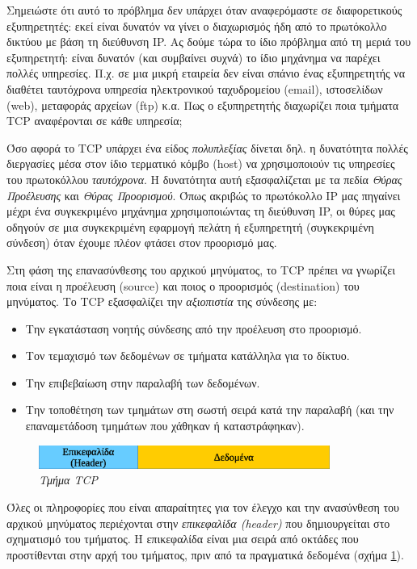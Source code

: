 Σημειώστε ότι αυτό το πρόβλημα δεν υπάρχει όταν αναφερόμαστε σε διαφορετικούς εξυπηρετητές: εκεί είναι δυνατόν να γίνει ο διαχωρισμός ήδη από το πρωτόκολλο δικτύου με βάση τη διεύθυνση IP. Ας δούμε τώρα το ίδιο πρόβλημα από τη μεριά του εξυπηρετητή: είναι δυνατόν (και συμβαίνει συχνά) το ίδιο μηχάνημα να παρέχει πολλές υπηρεσίες. Π.χ. σε μια μικρή εταιρεία δεν είναι σπάνιο ένας εξυπηρετητής να διαθέτει ταυτόχρονα υπηρεσία ηλεκτρονικού ταχυδρομείου (email), ιστοσελίδων (web), μεταφοράς αρχείων (ftp) κ.α. Πως ο εξυπηρετητής διαχωρίζει ποια τμήματα TCP αναφέρονται σε κάθε υπηρεσία;

Όσο αφορά το TCP υπάρχει ένα είδος \emph{πολυπλεξίας} δίνεται δηλ. η δυνατότητα πολλές διεργασίες μέσα στον ίδιο τερματικό κόμβο (host) να χρησιμοποιούν τις υπηρεσίες του πρωτοκόλλου \emph{ταυτόχρονα}. Η δυνατότητα αυτή εξασφαλίζεται με τα πεδία \emph{Θύρας Προέλευσης} και \emph{Θύρας Προορισμού}. Όπως ακριβώς το πρωτόκολλο IP μας πηγαίνει μέχρι ένα συγκεκριμένο μηχάνημα χρησιμοποιώντας τη διεύθυνση IP, οι θύρες μας οδηγούν σε μια συγκεκριμένη εφαρμογή πελάτη ή εξυπηρετητή (συγκεκριμένη σύνδεση) όταν έχουμε πλέον φτάσει στον προορισμό μας.

Στη φάση της επανασύνθεσης του αρχικού μηνύματος, το TCP πρέπει να γνωρίζει ποια είναι η προέλευση (source) και ποιος ο προορισμός (destination) του μηνύματος. Το TCP εξασφαλίζει την \emph{αξιοπιστία} της σύνδεσης με:

\begin{itemize}
\item Την εγκατάσταση νοητής σύνδεσης από την προέλευση στο προορισμό.
\item Τον τεμαχισμό των δεδομένων σε τμήματα κατάλληλα για το δίκτυο.
\item Την επιβεβαίωση στην παραλαβή των δεδομένων.
\item Την τοποθέτηση των τμημάτων στη σωστή σειρά κατά την παραλαβή (και την επαναμετάδοση τμημάτων που χάθηκαν ή καταστράφηκαν).
\end{itemize}

\begin{figure}[!ht]
 \centering
 \includegraphics[width=0.85\textwidth]{images/chapter4/4-2}
 \caption {\textsl{Τμήμα TCP}}
 \label{4-2}
\end{figure}

Όλες οι πληροφορίες που είναι απαραίτητες για τον έλεγχο και την ανασύνθεση του αρχικού μηνύματος περιέχονται στην \emph{επικεφαλίδα (header)} που δημιουργείται στο σχηματισμό του τμήματος. Η επικεφαλίδα είναι μια σειρά από οκτάδες που προστίθενται στην αρχή του τμήματος, πριν από τα πραγματικά δεδομένα (σχήμα \ref{4-2}).


